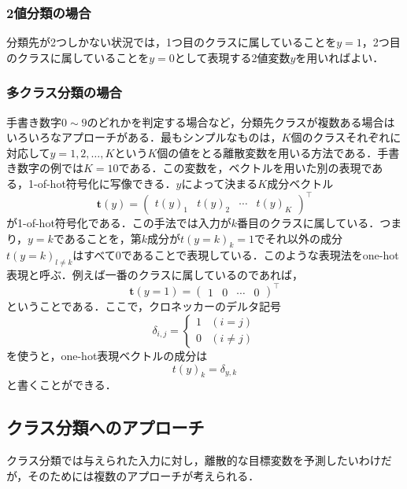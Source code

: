 \documentclass[a4paper,11pt]{jsreport}
\begin{document}
\subsubsection*{2値分類の場合}
分類先が2つしかない状況では，1つ目のクラスに属していることを$y=1$，2つ目のクラスに属していることを$y=0$として表現する2値変数$y$を用いればよい．
\subsubsection*{多クラス分類の場合}
手書き数字$0 \sim 9$のどれかを判定する場合など，分類先クラスが複数ある場合はいろいろなアプローチがある．最もシンプルなものは，$K$個のクラスそれぞれに対応して$y = 1, 2, \dots, K$という$K$個の値をとる離散変数を用いる方法である．手書き数字の例では$K = 10$である．この変数を，ベクトルを用いた別の表現である，1-of-hot符号化に写像できる．$y$によって決まる$K$成分ベクトル
\begin{equation}
  \bm{t}(y) = \begin{pmatrix}
    t(y)_1 & t(y)_2 & \cdots & t(y)_K
  \end{pmatrix}^{\top}
\end{equation}
が1-of-hot符号化である．この手法では入力が$k$番目のクラスに属している．つまり，$y=k$であることを，第$k$成分が$t(y=k)_{k} = 1$でそれ以外の成分$t(y=k)_{l \neq k}$はすべて0であることで表現している．このような表現法をone-hot表現と呼ぶ．例えば一番のクラスに属しているのであれば，
\begin{equation}
  \bm{t}(y=1) = \begin{pmatrix}
    1 & 0 & \cdots & 0
  \end{pmatrix}^{\top}
\end{equation}
ということである．ここで，クロネッカーのデルタ記号
\begin{equation}
  \delta_{i, j} 
  = \begin{cases}
    1 & (i = j) \\
    0 & (i \neq j)
  \end{cases}
\end{equation}
を使うと，one-hot表現ベクトルの成分は
\begin{equation}
  t(y)_k = \delta_{y, k}
\end{equation}
と書くことができる．

\subsection{クラス分類へのアプローチ}
クラス分類では与えられた入力に対し，離散的な目標変数を予測したいわけだが，そのためには複数のアプローチが考えられる．
\end{document}
